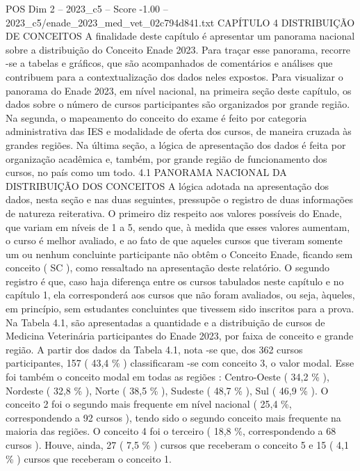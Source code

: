 \begin{textsample}{POS Dim 2 – 2023\_c5 – Score -1.00 – 2023\_c5/enade\_2023\_med\_vet\_02c794d841.txt}  \label{ex:f2_pos_261}
CAPÍTULO 4 DISTRIBUIÇÃO DE CONCEITOS A finalidade deste capítulo é apresentar um panorama nacional sobre a distribuição do Conceito Enade 2023.
Para traçar esse panorama, recorre -se a tabelas e gráficos, que são acompanhados de comentários e análises que contribuem para a contextualização dos dados neles expostos.
Para visualizar o panorama do Enade 2023, em nível nacional, na primeira seção deste capítulo, os dados sobre o número de cursos participantes são organizados por grande região.
Na segunda, o mapeamento do conceito do exame é feito por categoria administrativa das IES e modalidade de oferta dos cursos, de maneira cruzada às grandes regiões.
Na última seção, a lógica de apresentação dos dados é feita por organização acadêmica e, também, por grande região de funcionamento dos cursos, no país como um todo. 4.1 PANORAMA NACIONAL DA DISTRIBUIÇÃO DOS CONCEITOS A lógica adotada na apresentação dos dados, nesta seção e nas duas seguintes, pressupõe o registro de duas informações de natureza reiterativa.
O primeiro diz respeito aos valores possíveis do Enade, que variam em níveis de 1 a 5, sendo que, à medida que esses valores aumentam, o curso é melhor avaliado, e ao fato de que aqueles cursos que tiveram somente um ou nenhum concluinte participante não obtêm o Conceito Enade, ficando sem conceito ( SC ), como ressaltado na apresentação deste relatório.
O segundo registro é que, caso haja diferença entre os cursos tabulados neste capítulo e no capítulo 1, ela corresponderá aos cursos que não foram avaliados, ou seja, àqueles, em princípio, sem estudantes concluintes que tivessem sido inscritos para a prova.
Na Tabela 4.1, são apresentadas a quantidade e a distribuição de cursos de Medicina Veterinária participantes do Enade 2023, por faixa de conceito e grande região.
A partir dos dados da Tabela 4.1, nota -se que, dos 362 cursos participantes, 157 ( 43,4 \% ) classificaram -se com conceito 3, o valor modal.
Esse foi também o conceito modal em todas as regiões : Centro-Oeste ( 34,2 \% ), Nordeste ( 32,8 \% ), Norte ( 38,5 \% ), Sudeste ( 48,7 \% ), Sul ( 46,9 \% ).
O conceito 2 foi o segundo mais frequente em nível nacional ( 25,4 \%, correspondendo a 92 cursos ), tendo sido o segundo conceito mais frequente na maioria das regiões.
O conceito 4 foi o terceiro ( 18,8 \%, correspondendo a 68 cursos ).
Houve, ainda, 27 ( 7,5 \% ) cursos que receberam o conceito 5 e 15 ( 4,1 \% ) cursos que receberam o conceito 1.

\end{textsample}
